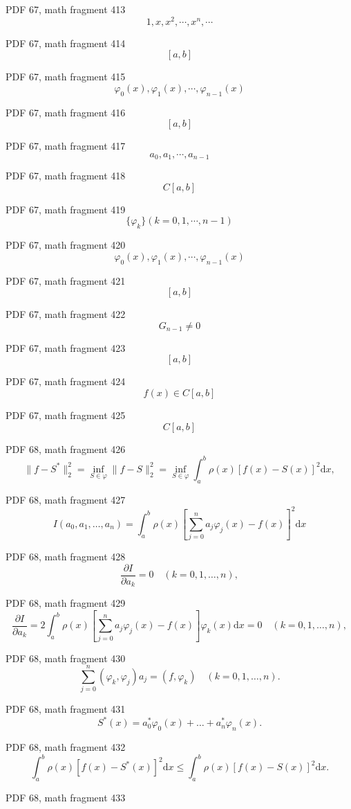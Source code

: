 \documentclass[UTF8,fontset=fandol]{ctexart}
\begin{document}
\par
PDF 67, math fragment 413
\[1, x, x^2, \cdots, x^n, \cdots\]
\par
PDF 67, math fragment 414
\[[a,b]\]
\par
PDF 67, math fragment 415
\[\varphi_0(x), \varphi_1(x), \cdots, \varphi_{n-1}(x)\]
\par
PDF 67, math fragment 416
\[[a,b]\]
\par
PDF 67, math fragment 417
\[a_0, a_1, \cdots, a_{n-1}\]
\par
PDF 67, math fragment 418
\[C[a,b]\]
\par
PDF 67, math fragment 419
\[\{\varphi_k\} (k=0,1, \cdots, n-1)\]
\par
PDF 67, math fragment 420
\[\varphi_0(x), \varphi_1(x), \cdots, \varphi_{n-1}(x)\]
\par
PDF 67, math fragment 421
\[[a,b]\]
\par
PDF 67, math fragment 422
\[G_{n-1} \neq 0\]
\par
PDF 67, math fragment 423
\[[a,b]\]
\par
PDF 67, math fragment 424
\[f(x) \in C[a,b]\]
\par
PDF 67, math fragment 425
\[C[a,b]\]
\par
PDF 68, math fragment 426
\[
\| f - S^* \|_2^2 = \inf_{S \in \varphi} \| f - S \|_2^2 = \inf_{S \in \varphi} \int_a^b \rho(x) [f(x) - S(x)]^2 \mathrm{d}x, \tag{3.3.11}
\]
\par
PDF 68, math fragment 427
\[
I(a_0, a_1, \dots, a_n) = \int_a^b \rho(x) \left[ \sum_{j=0}^n a_j \varphi_j(x) - f(x) \right]^2 \mathrm{d}x \tag{3.3.12}
\]
\par
PDF 68, math fragment 428
\[
\frac{\partial I}{\partial a_k} = 0 \quad (k = 0, 1, \dots, n),
\]
\par
PDF 68, math fragment 429
\[
\frac{\partial I}{\partial a_k} = 2 \int_a^b \rho(x) \left[ \sum_{j=0}^n a_j \varphi_j(x) - f(x) \right] \varphi_k(x) \mathrm{d}x = 0 \quad (k = 0, 1, \dots, n),
\]
\par
PDF 68, math fragment 430
\[
\sum_{j=0}^n (\varphi_k, \varphi_j) a_j = (f, \varphi_k) \quad (k = 0, 1, \dots, n). \tag{3.3.13}
\]
\par
PDF 68, math fragment 431
\[
S^*(x) = a_0^* \varphi_0(x) + \dots + a_n^* \varphi_n(x).
\]
\par
PDF 68, math fragment 432
\[
\int_a^b \rho(x) [f(x) - S^*(x)]^2 \mathrm{d}x \leqslant \int_a^b \rho(x) [f(x) - S(x)]^2 \mathrm{d}x. \tag{3.3.14}
\]
\par
PDF 68, math fragment 433
\end{document}
